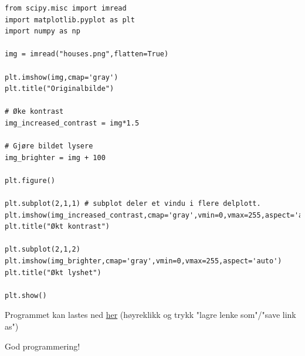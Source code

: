 \documentclass[%
oneside,                 %
final,                   %
10pt,norsk]{article}
\begin{document}
\begin{verbatim}
from scipy.misc import imread
import matplotlib.pyplot as plt
import numpy as np

img = imread("houses.png",flatten=True)

plt.imshow(img,cmap='gray')
plt.title("Originalbilde")

# Øke kontrast
img_increased_contrast = img*1.5

# Gjøre bildet lysere
img_brighter = img + 100

plt.figure()

plt.subplot(2,1,1) # subplot deler et vindu i flere delplott.
plt.imshow(img_increased_contrast,cmap='gray',vmin=0,vmax=255,aspect='auto')
plt.title("Økt kontrast")

plt.subplot(2,1,2)
plt.imshow(img_brighter,cmap='gray',vmin=0,vmax=255,aspect='auto')
plt.title("Økt lyshet")

plt.show()
\end{verbatim}
Programmet kan lastes ned \href{{https://github.com/krisbhei/INF2310/raw/master/Programmering/Python/demo.py}}{her} (høyreklikk og trykk "lagre lenke som"/"save link as")

God programmering!



\end{document}
